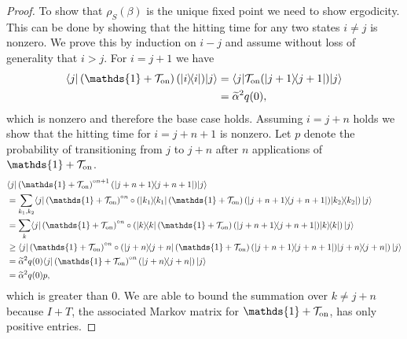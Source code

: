 \documentclass{article}
\newcommand{\on}{\rm on}
\newcommand{\ket}[1]{|#1\rangle}
\newcommand{\bra}[1]{\langle #1|}
\newcommand{\ketbra}[2]{| #1\rangle\! \langle #2|}
\newcommand{\TT}{\mathcal{T}}
\newcommand{\identity}{\mathds{1}}
\begin{document}
\begin{proof}
    To show that $\rho_S(\beta)$ is the unique fixed point we need to show ergodicity. This can be done by showing that the hitting time for any two states $i \neq j$ is nonzero. We prove this by induction on $i - j$ and assume without loss of generality that $i > j$. For $i = j + 1$ we have
    \begin{align}
        \bra{j} \left( \identity + \TT_{\on} \right)(\ketbra{i}{i}) \ket{j} &= \bra{j} \TT_{\on}(\ketbra{j + 1}{j + 1}) \ket{j} \\
        &= \widetilde{\alpha}^2 q(0),
    \end{align} 
    which is nonzero and therefore the base case holds. Assuming $i = j + n$ holds we show that the hitting time for $i = j + n + 1$ is nonzero. Let $p$ denote the probability of transitioning from $j$ to $j + n$ after $n$ applications of $\identity + \TT_{\on}$. 
    \begin{align}
        &\bra{j } \left(\identity + \TT_{\on} \right)^{\circ n + 1} (\ketbra{j+ n + 1}{j+ n + 1}) \ket{j } \nonumber \\
        &= \sum_{k_1, k_2}\bra{j } \left(\identity + \TT_{\on} \right)^{\circ n} \circ \left(\ketbra{k_1}{k_1}\left(\identity + \TT_{\on} \right) (\ketbra{j+ n + 1}{j+ n + 1}) \ketbra{k_2}{k_2} \right) \ket{j } \\
        &= \sum_{k}\bra{j } \left(\identity + \TT_{\on} \right)^{\circ n} \circ \left(\ketbra{k}{k}\left(\identity + \TT_{\on} \right) (\ketbra{j+ n + 1}{j+ n + 1}) \ketbra{k}{k} \right) \ket{j } \\
        &\ge \bra{j } \left(\identity + \TT_{\on} \right)^{\circ n} \circ \left(\ketbra{j + n}{j + n}\left(\identity + \TT_{\on} \right) (\ketbra{j+ n + 1}{j+ n + 1}) \ketbra{j + n}{j + n} \right) \ket{j } \\
        &= \widetilde{\alpha}^2 q(0) \bra{j } \left(\identity + \TT_{\on} \right)^{\circ n} \left(\ketbra{j + n}{j + n}\right)\ket{j } \\
        &= \widetilde{\alpha}^2 q(0) p,
    \end{align}
    which is greater than 0. We are able to bound the summation over $k \neq j + n$ because $I + T$, the associated Markov matrix for $\identity + \TT_{\on}$, has only positive entries.


\end{proof}
\end{document}
